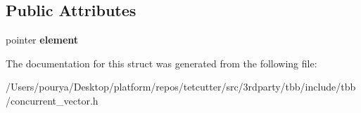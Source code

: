 \subsection*{Public Attributes}
\begin{DoxyCompactItemize}
\item 
\hypertarget{structtbb_1_1concurrent__vector_1_1push__back__helper_1_1element__construction__guard_a397375295f0bb5ba5d41427b1ff49ed3}{}pointer {\bfseries element}\label{structtbb_1_1concurrent__vector_1_1push__back__helper_1_1element__construction__guard_a397375295f0bb5ba5d41427b1ff49ed3}

\end{DoxyCompactItemize}


The documentation for this struct was generated from the following file\+:\begin{DoxyCompactItemize}
\item 
/\+Users/pourya/\+Desktop/platform/repos/tetcutter/src/3rdparty/tbb/include/tbb/concurrent\+\_\+vector.\+h\end{DoxyCompactItemize}

